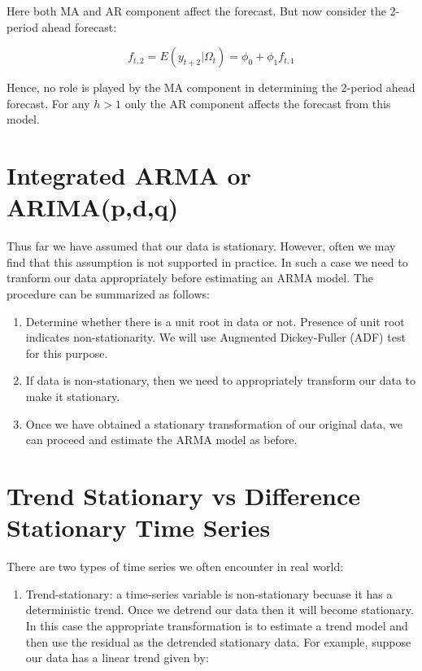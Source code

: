 \documentclass[]{book}
\providecommand{\tightlist}{%
  \setlength{\itemsep}{0pt}\setlength{\parskip}{0pt}}
\theoremstyle{definition}
\theoremstyle{definition}
\theoremstyle{definition}
\theoremstyle{remark}
\begin{document}
Here both MA and AR component affect the forecast. But now consider the
2-period ahead forecast:

\[f_{t,2} = E(y_{t+2}|\Omega_t) = \phi_0 + \phi_1 f_{t,1}\]

Hence, no role is played by the MA component in determining the 2-period
ahead forecast. For any \(h>1\) only the AR component affects the
forecast from this model.

\hypertarget{integrated-arma-or-arimapdq}{%
\section{Integrated ARMA or
ARIMA(p,d,q)}\label{integrated-arma-or-arimapdq}}

Thus far we have assumed that our data is stationary. However, often we
may find that this assumption is not supported in practice. In such a
case we need to tranform our data appropriately before estimating an
ARMA model. The procedure can be summarized as follows:

\begin{enumerate}
\def\labelenumi{\arabic{enumi}.}
\item
  Determine whether there is a unit root in data or not. Presence of
  unit root indicates non-stationarity. We will use Augmented
  Dickey-Fuller (ADF) test for this purpose.
\item
  If data is non-stationary, then we need to appropriately transform our
  data to make it stationary.
\item
  Once we have obtained a stationary transformation of our original
  data, we can proceed and estimate the ARMA model as before.
\end{enumerate}

\hypertarget{trend-stationary-vs-difference-stationary-time-series}{%
\section{Trend Stationary vs Difference Stationary Time
Series}\label{trend-stationary-vs-difference-stationary-time-series}}

There are two types of time series we often encounter in real world:

\begin{enumerate}
\def\labelenumi{\arabic{enumi}.}
\tightlist
\item
  Trend-stationary: a time-series variable is non-stationary becuase it
  has a deterministic trend. Once we detrend our data then it will
  become stationary. In this case the appropriate transformation is to
  estimate a trend model and then use the residual as the detrended
  stationary data. For example, suppose our data has a linear trend
  given by:
\end{enumerate}
\end{document}
